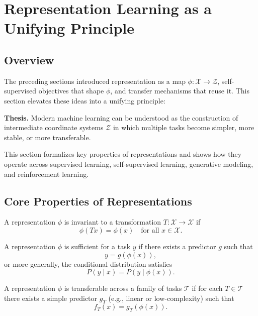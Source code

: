 \section{Representation Learning as a Unifying Principle}

\subsection{Overview}

The preceding sections introduced representation as a map $\phi: \mathcal{X} \to \mathcal{Z}$, self-supervised objectives that shape $\phi$, and transfer mechanisms that reuse it.  
This section elevates these ideas into a unifying principle:

\medskip

\noindent
\textbf{Thesis.}  
Modern machine learning can be understood as the construction of intermediate coordinate systems $\mathcal{Z}$ in which multiple tasks become simpler, more stable, or more transferable.

\medskip

This section formalizes key properties of representations and shows how they operate across supervised learning, self-supervised learning, generative modeling, and reinforcement learning.

\subsection{Core Properties of Representations}

\begin{definition}[Invariance]
A representation $\phi$ is invariant to a transformation $T:\mathcal{X}\to\mathcal{X}$ if
\[
\phi(Tx) = \phi(x) \quad \text{for all } x \in \mathcal{X}.
\]
\end{definition}

\begin{definition}[Sufficiency]
A representation $\phi$ is sufficient for a task $y$ if there exists a predictor $g$ such that
\[
y = g(\phi(x)),
\]
or more generally, the conditional distribution satisfies
\[
P(y \mid x) = P(y \mid \phi(x)).
\]
\end{definition}

\begin{definition}[Transferability]
A representation $\phi$ is transferable across a family of tasks $\mathcal{T}$ if for each $T \in \mathcal{T}$ there exists a simple predictor $g_T$ (e.g., linear or low-complexity) such that
\[
f_T(x) = g_T(\phi(x)).
\]
\end{definition}

